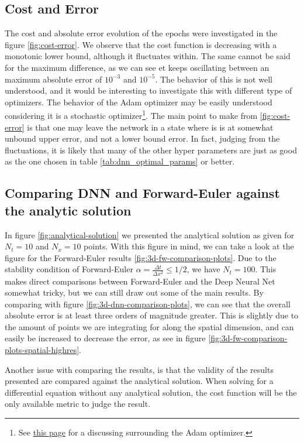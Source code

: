 \subsection{Cost and Error}
The cost and absolute error evolution of the epochs were investigated in the figure \ref{fig:cost-error}. We observe that the cost function is decreasing with a monotonic lower bound, although it fluctuates within. The same cannot be said for the maximum difference, as we can see et keeps oscillating between an maximum absolute error of $10^{-3}$ and $10^{-5}$. The behavior of this is not well understood, and it would be interesting to investigate this with different type of optimizers. The behavior of the Adam optimizer may be easily understood considering it is a stochastic optimizer\footnote{See \href{https://machinelearningmastery.com/adam-optimization-algorithm-for-deep-learning/}{this page} for a discussing surrounding the Adam optimizer.}. The main point to make from \ref{fig:cost-error} is that one may leave the network in a state where is is at somewhat unbound upper error, and not a lower bound error. In fact, judging from the fluctuations, it is likely that many of the other hyper parameters are just as good as the one chosen in table \ref{tab:dnn_optimal_params} or better.

\subsection{Comparing DNN and Forward-Euler against the analytic solution}
In figure \ref{fig:analytical-solution} we presented the analytical solution as given for $N_t=10$ and $N_x=10$ points. With this figure in mind, we can take a look at the figure for the Forward-Euler results \ref{fig:3d-fw-comparison-plots}. Due to the stability condition of Forward-Euler $\alpha = \frac{\Delta t}{\Delta x^2} \leq 1/2$, we have $N_t=100$. This makes direct comparisons between Forward-Euler and the Deep Neural Net somewhat tricky, but we can still draw out some of the main results. By comparing with figure \ref{fig:3d-dnn-comparison-plots}, we can see that the overall absolute error is at least three orders of magnitude greater. This is slightly due to the amount of points we are integrating for along the spatial dimension, and can easily be increased to decrease the error, as see in figure \ref{fig:3d-fw-comparison-plots-spatial-highres}.

Another issue with comparing the results, is that the validity of the results presented are compared against the analytical solution. When solving for a differential equation without any analytical solution, the cost function will be the only available metric to judge the result.


